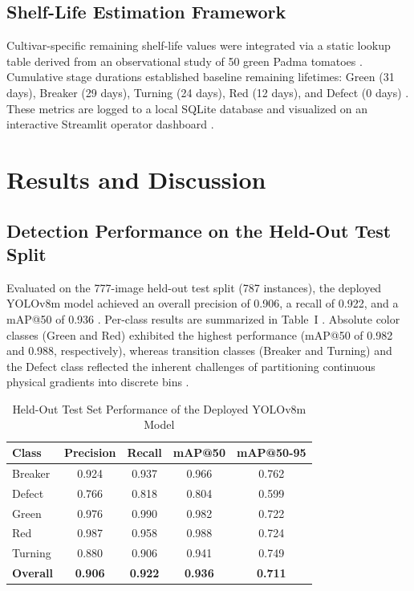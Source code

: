 \documentclass[conference,pageno]{IEEEtran}
\begin{document}
\subsection{Shelf-Life Estimation Framework}
Cultivar-specific remaining shelf-life values were integrated via a static lookup table derived from an observational study of 50 green Padma tomatoes \cite{abekoon2024, tarlak2023}. Cumulative stage durations established baseline remaining lifetimes: Green (31 days), Breaker (29 days), Turning (24 days), Red (12 days), and Defect (0 days) \cite{abekoon2024}. These metrics are logged to a local SQLite database and visualized on an interactive Streamlit operator dashboard \cite{geetha2025}.

\section{Results and Discussion}

\subsection{Detection Performance on the Held-Out Test Split}
Evaluated on the 777-image held-out test split (787 instances), the deployed $\text{YOLOv8m}$ model achieved an overall precision of 0.906, a recall of 0.922, and a mAP@50 of 0.936 \cite{padilla2020}. Per-class results are summarized in Table~I \cite{padilla2020}. Absolute color classes (Green and Red) exhibited the highest performance (mAP@50 of 0.982 and 0.988, respectively), whereas transition classes (Breaker and Turning) and the Defect class reflected the inherent challenges of partitioning continuous physical gradients into discrete bins \cite{usda1991}. 

\begin{table}[htbp]
\caption{Held-Out Test Set Performance of the Deployed YOLOv8m Model \cite{padilla2020}}
\begin{center}
\begin{tabular}{|l|c|c|c|c|}
\hline
\textbf{Class} & \textbf{Precision} & \textbf{Recall} & \textbf{mAP@50} & \textbf{mAP@50-95} \\
\hline
Breaker & 0.924 & 0.937 & 0.966 & 0.762 \\
Defect  & 0.766 & 0.818 & 0.804 & 0.599 \\
Green   & 0.976 & 0.990 & 0.982 & 0.722 \\
Red     & 0.987 & 0.958 & 0.988 & 0.724 \\
Turning & 0.880 & 0.906 & 0.941 & 0.749 \\
\hline
\textbf{Overall} & \textbf{0.906} & \textbf{0.922} & \textbf{0.936} & \textbf{0.711} \\
\hline
\end{tabular}
\label{tab:perf}
\end{center}
\end{table}
\end{document}

